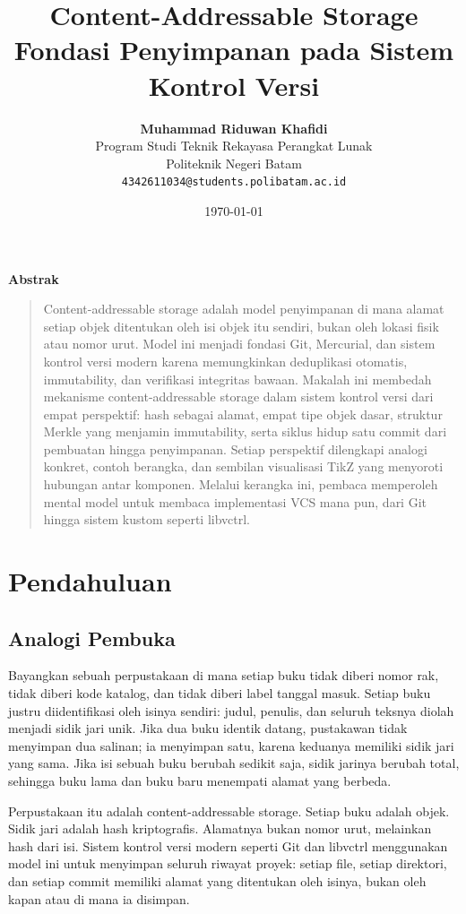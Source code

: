 \documentclass[11pt,a4paper]{article}
\title{\vspace{-1.5cm}\textbf{\sffamily\LARGE Content-Addressable Storage\\ Fondasi Penyimpanan pada Sistem Kontrol Versi}}
\author{
	\textbf{Muhammad Riduwan Khafidi} \\
	\small Program Studi Teknik Rekayasa Perangkat Lunak \\
	\small Politeknik Negeri Batam \\
	\small \texttt{4342611034@students.polibatam.ac.id}
}
\date{\small\today}
\renewenvironment{abstract}
{\small
	\begin{center}\textbf{\sffamily Abstrak}\end{center}
	\begin{quote}}
	{\end{quote}}
\begin{document}
\maketitle
\thispagestyle{empty}

\begin{abstract}
	Content-addressable storage adalah model penyimpanan di mana alamat setiap objek ditentukan oleh isi objek itu sendiri, bukan oleh lokasi fisik atau nomor urut. Model ini menjadi fondasi Git, Mercurial, dan sistem kontrol versi modern karena memungkinkan deduplikasi otomatis, immutability, dan verifikasi integritas bawaan. Makalah ini membedah mekanisme content-addressable storage dalam sistem kontrol versi dari empat perspektif: hash sebagai alamat, empat tipe objek dasar, struktur Merkle yang menjamin immutability, serta siklus hidup satu commit dari pembuatan hingga penyimpanan. Setiap perspektif dilengkapi analogi konkret, contoh berangka, dan sembilan visualisasi TikZ yang menyoroti hubungan antar komponen. Melalui kerangka ini, pembaca memperoleh mental model untuk membaca implementasi VCS mana pun, dari Git hingga sistem kustom seperti libvctrl.
\end{abstract}

\section{Pendahuluan}

\subsection{Analogi Pembuka}

Bayangkan sebuah perpustakaan di mana setiap buku tidak diberi nomor rak, tidak diberi kode katalog, dan tidak diberi label tanggal masuk. Setiap buku justru diidentifikasi oleh isinya sendiri: judul, penulis, dan seluruh teksnya diolah menjadi sidik jari unik. Jika dua buku identik datang, pustakawan tidak menyimpan dua salinan; ia menyimpan satu, karena keduanya memiliki sidik jari yang sama. Jika isi sebuah buku berubah sedikit saja, sidik jarinya berubah total, sehingga buku lama dan buku baru menempati alamat yang berbeda.

Perpustakaan itu adalah content-addressable storage. Setiap buku adalah objek. Sidik jari adalah hash kriptografis. Alamatnya bukan nomor urut, melainkan hash dari isi. Sistem kontrol versi modern seperti Git dan libvctrl menggunakan model ini untuk menyimpan seluruh riwayat proyek: setiap file, setiap direktori, dan setiap commit memiliki alamat yang ditentukan oleh isinya, bukan oleh kapan atau di mana ia disimpan.
\end{document}
